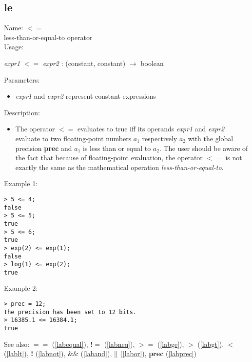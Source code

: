 \subsection{le}
\label{lable}
\noindent Name: \textbf{$<=$}\\
less-than-or-equal-to operator\\

\noindent Usage: 
\begin{center}
\emph{expr1} \textbf{$<=$} \emph{expr2} : (\textsf{constant}, \textsf{constant}) $\rightarrow$ \textsf{boolean}\\
\end{center}
Parameters: 
\begin{itemize}
\item \emph{expr1} and \emph{expr2} represent constant expressions
\end{itemize}
\noindent Description: \begin{itemize}

\item The operator \textbf{$<=$} evaluates to true iff its operands \emph{expr1} and
   \emph{expr2} evaluate to two floating-point numbers $a_1$
   respectively $a_2$ with the global precision \textbf{prec} and
   $a_1$ is less than or equal to $a_2$. The user should
   be aware of the fact that because of floating-point evaluation, the
   operator \textbf{$<=$} is not exactly the same as the mathematical
   operation \emph{less-than-or-equal-to}.
\end{itemize}
\noindent Example 1: 
\begin{center}\begin{minipage}{15cm}\begin{Verbatim}[frame=single]
> 5 <= 4;
false
> 5 <= 5;
true
> 5 <= 6;
true
> exp(2) <= exp(1);
false
> log(1) <= exp(2);
true
\end{Verbatim}
\end{minipage}\end{center}
\noindent Example 2: 
\begin{center}\begin{minipage}{15cm}\begin{Verbatim}[frame=single]
> prec = 12;
The precision has been set to 12 bits.
> 16385.1 <= 16384.1;
true
\end{Verbatim}
\end{minipage}\end{center}
See also: \textbf{$==$} (\ref{labequal}), \textbf{!$=$} (\ref{labneq}), \textbf{$>=$} (\ref{labge}), \textbf{$>$} (\ref{labgt}), \textbf{$<$} (\ref{lablt}), \textbf{!} (\ref{labnot}), \textbf{$\&\&$} (\ref{laband}), \textbf{$||$} (\ref{labor}), \textbf{prec} (\ref{labprec})
